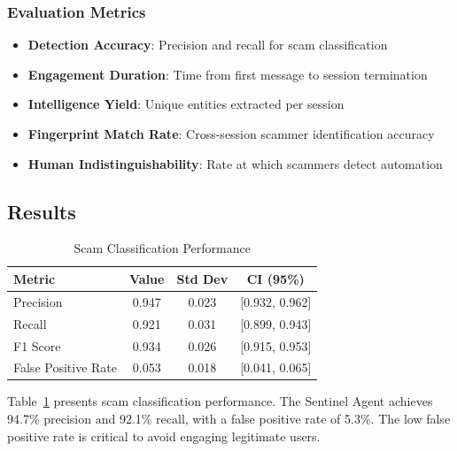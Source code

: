 \documentclass[conference]{IEEEtran}
\begin{document}
\subsubsection{Evaluation Metrics}
\begin{itemize}
    \item \textbf{Detection Accuracy}: Precision and recall for scam classification
    \item \textbf{Engagement Duration}: Time from first message to session termination
    \item \textbf{Intelligence Yield}: Unique entities extracted per session
    \item \textbf{Fingerprint Match Rate}: Cross-session scammer identification accuracy
    \item \textbf{Human Indistinguishability}: Rate at which scammers detect automation
\end{itemize}

\subsection{Results}

\begin{table}[htbp]
\caption{Scam Classification Performance}
\label{tab:classification}
\begin{center}
\begin{tabular}{|l|c|c|c|}
\hline
\textbf{Metric} & \textbf{Value} & \textbf{Std Dev} & \textbf{CI (95\%)} \\
\hline
Precision & 0.947 & 0.023 & [0.932, 0.962] \\
\hline
Recall & 0.921 & 0.031 & [0.899, 0.943] \\
\hline
F1 Score & 0.934 & 0.026 & [0.915, 0.953] \\
\hline
False Positive Rate & 0.053 & 0.018 & [0.041, 0.065] \\
\hline
\end{tabular}
\end{center}
\end{table}

Table~\ref{tab:classification} presents scam classification performance. The Sentinel Agent achieves 94.7\% precision and 92.1\% recall, with a false positive rate of 5.3\%. The low false positive rate is critical to avoid engaging legitimate users.
\end{document}
